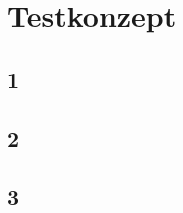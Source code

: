 \section{Testkonzept} \label{sec:Testkonzept}

\subsection{1} \label{subsec:1}

\subsection{2} \label{subsec:2}

\subsection{3} \label{subsec:3}